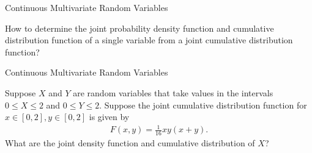 \begin{frame}{Continuous Multivariate Random Variables}

\justifying
{} How to determine the joint probability density function and cumulative distribution function of a single variable from a joint cumulative distribution function? \\

\end{frame}

\begin{frame}{Continuous Multivariate Random Variables}

\justifying
{} Suppose $X$ and $Y$ are random variables that take values in the intervals $0\leq X\leq 2$ and $0\leq Y\leq 2$. Suppose the joint cumulative distribution function for $x\in [0, 2], y\in [0, 2]$ is given by
\begin{align*}
F(x, y) = \frac{1}{16}xy(x + y).
\end{align*}
What are the joint density function and cumulative distribution of $X$? \\

\end{frame}




